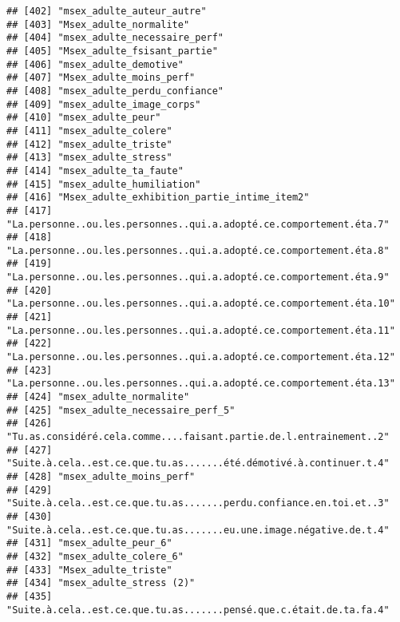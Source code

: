\documentclass[
]{article}
\begin{document}
\begin{verbatim}
## [402] "msex_adulte_auteur_autre"                                          
## [403] "Msex_adulte_normalite"                                             
## [404] "msex_adulte_necessaire_perf"                                       
## [405] "Msex_adulte_fsisant_partie"                                        
## [406] "msex_adulte_demotive"                                              
## [407] "Msex_adulte_moins_perf"                                            
## [408] "msex_adulte_perdu_confiance"                                       
## [409] "msex_adulte_image_corps"                                           
## [410] "msex_adulte_peur"                                                  
## [411] "msex_adulte_colere"                                                
## [412] "msex_adulte_triste"                                                
## [413] "msex_adulte_stress"                                                
## [414] "msex_adulte_ta_faute"                                              
## [415] "msex_adulte_humiliation"                                           
## [416] "Msex_adulte_exhibition_partie_intime_item2"                        
## [417] "La.personne..ou.les.personnes..qui.a.adopté.ce.comportement.éta.7" 
## [418] "La.personne..ou.les.personnes..qui.a.adopté.ce.comportement.éta.8" 
## [419] "La.personne..ou.les.personnes..qui.a.adopté.ce.comportement.éta.9" 
## [420] "La.personne..ou.les.personnes..qui.a.adopté.ce.comportement.éta.10"
## [421] "La.personne..ou.les.personnes..qui.a.adopté.ce.comportement.éta.11"
## [422] "La.personne..ou.les.personnes..qui.a.adopté.ce.comportement.éta.12"
## [423] "La.personne..ou.les.personnes..qui.a.adopté.ce.comportement.éta.13"
## [424] "msex_adulte_normalite"                                             
## [425] "msex_adulte_necessaire_perf_5"                                     
## [426] "Tu.as.considéré.cela.comme....faisant.partie.de.l.entrainement..2" 
## [427] "Suite.à.cela..est.ce.que.tu.as.......été.démotivé.à.continuer.t.4" 
## [428] "msex_adulte_moins_perf"                                            
## [429] "Suite.à.cela..est.ce.que.tu.as.......perdu.confiance.en.toi.et..3" 
## [430] "Suite.à.cela..est.ce.que.tu.as.......eu.une.image.négative.de.t.4" 
## [431] "msex_adulte_peur_6"                                                
## [432] "msex_adulte_colere_6"                                              
## [433] "Msex_adulte_triste"                                                
## [434] "msex_adulte_stress (2)"                                            
## [435] "Suite.à.cela..est.ce.que.tu.as.......pensé.que.c.était.de.ta.fa.4" 

\end{verbatim}
\end{document}
